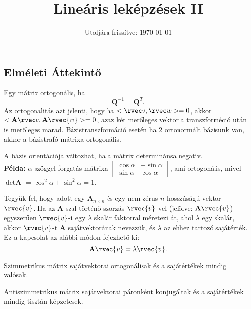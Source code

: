 \documentclass[a4paper, 12pt]{scrartcl}
\title{Lineáris leképzések II}
\date{Utoljára frissítve: \today}
\begin{document}
\maketitle
\subsection{Elméleti Áttekintő}
\begin{definition}[Ortogonalitás]
  Egy mátrix ortogonális, ha
  \[
    \textbf{Q}^{-1} = \textbf{Q}^T.
  \]
  Az ortogonalitás azt jelenti, hogy ha $<\rvec v, \rvec w>=0$, akkor $<\textbf{A}\rvec v, \textbf{A}\rvec{w}> =0$, azaz két merőleges vektor a transzforméció után is merőleges marad. Bázistranszformáció esetén ha 2 ortonormált bázisunk van, akkor a bázistrafó mátrixa ortogonális.
\end{definition}
\begin{blueBox}
  A bázis orientációja változhat, ha a mátrix determinánsa negatív.\\
  \textbf{Példa:} $\alpha$ szöggel forgatás mátrixa $\begin{bmatrix}
      \cos \alpha & -\sin \alpha \\
      \sin \alpha & \cos \alpha
    \end{bmatrix}$, ami ortogonális, mivel $\operatorname{det}\textbf{A}$ = $\cos^2 \alpha + \sin^2 \alpha = 1$.
\end{blueBox}

\begin{definition}
  Tegyük fel, hogy adott egy $\textbf{A}_{n \times n}$ és egy nem zérus $n$ hosszúságú vektor $\rvec{v}$. Ha az $\textbf{A}$-szal történő szorzás $\rvec{v}$-vel (jelölve: $\textbf{A}\rvec{v}$) egyszerűen $\rvec{v}$-t egy $\lambda$ skalár faktorral méretezi át, ahol $\lambda$ egy skalár, akkor $\rvec{v}$-t $\textbf{A}$ sajátvektorának nevezzük, és $\lambda$ az ehhez tartozó sajátérték. Ez a kapcsolat az alábbi módon fejezhető ki:
  \[
    \textbf{A}\rvec{v} = \lambda \rvec{v}.
  \]
\end{definition}

\begin{note}
  Szimmetrikus mátrix sajátvektorai ortogonálisak és a sajátértékek mindig valósak.
\end{note}

\begin{note}
  Antiszimmetrikus mátrix sajátvektorai páronként konjugáltak és a sajátértékek mindig tisztán képzetesek.
\end{note}
\end{document}
